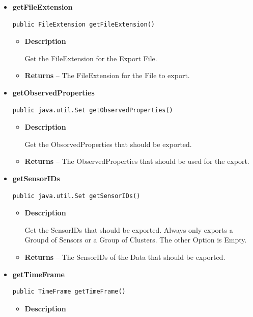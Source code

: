 {{{{{{{\begin{itemize}
{\begin{itemize}
{Get the ClusterIDs that should be exported. Always only exports a Groupd of Sensors or a Group of Clusters. The other Option is Empty.
}
\item{{\bf  Returns} --
The Clusters that should be taken in the Export.
}%
\end{itemize}
}%
\item{
\hypertarget{Export.ExportProperties.getFileExtension()}{{\bf  getFileExtension}\\}
\begin{lstlisting}[frame=none]
public FileExtension getFileExtension()\end{lstlisting} %
\begin{itemize}
\item{
{\bf  Description}

Get the FileExtension for the Export File.
}
\item{{\bf  Returns} --
The FileExtension for the File to export.
}%
\end{itemize}
}%
\item{
\hypertarget{Export.ExportProperties.getObservedProperties()}{{\bf  getObservedProperties}\\}
\begin{lstlisting}[frame=none]
public java.util.Set getObservedProperties()\end{lstlisting} %
\begin{itemize}
\item{
{\bf  Description}

Get the ObsorvedProperties that should be exported.
}
\item{{\bf  Returns} --
The ObservedProperties that should be used for the export.
}%
\end{itemize}
}%
\item{
\hypertarget{Export.ExportProperties.getSensorIDs()}{{\bf  getSensorIDs}\\}
\begin{lstlisting}[frame=none]
public java.util.Set getSensorIDs()\end{lstlisting} %
\begin{itemize}
\item{
{\bf  Description}

Get the SensorIDs that should be exported. Always only exports a Groupd of Sensors or a Group of Clusters. The other Option is Empty.
}
\item{{\bf  Returns} --
The SensorIDs of the Data that should be exported.
}%
\end{itemize}
}%
\item{
\hypertarget{Export.ExportProperties.getTimeFrame()}{{\bf  getTimeFrame}\\}
\begin{lstlisting}[frame=none]
public TimeFrame getTimeFrame()\end{lstlisting} %
\begin{itemize}
\item{
{\bf  Description}

}
\end{itemize}}
\end{itemize}}}}}}}}
